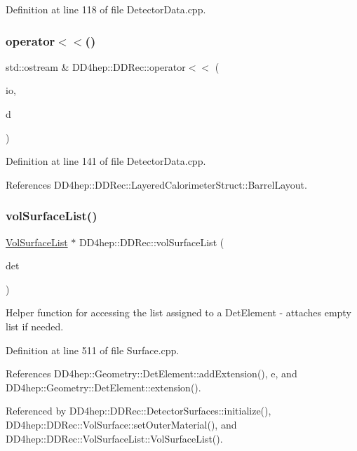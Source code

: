 Definition at line 118 of file Detector\+Data.\+cpp.

\hypertarget{namespace_d_d4hep_1_1_d_d_rec_a56c7e8b362aec38f71cfccb7b1bfd0a4}{}\label{namespace_d_d4hep_1_1_d_d_rec_a56c7e8b362aec38f71cfccb7b1bfd0a4} 
\subsubsection{\texorpdfstring{operator$<$$<$()}{operator<<()}\hspace{0.1cm}{\footnotesize\ttfamily [7/7]}}
{\footnotesize\ttfamily std\+::ostream \& D\+D4hep\+::\+D\+D\+Rec\+::operator$<$$<$ (\begin{DoxyParamCaption}\item[{std\+::ostream \&}]{io,  }\item[{const \hyperlink{namespace_d_d4hep_1_1_d_d_rec_ab7bf707189c3166efa20740e6f7524b9}{Layered\+Calorimeter\+Data} \&}]{d }\end{DoxyParamCaption})}



Definition at line 141 of file Detector\+Data.\+cpp.



References D\+D4hep\+::\+D\+D\+Rec\+::\+Layered\+Calorimeter\+Struct\+::\+Barrel\+Layout.

\hypertarget{namespace_d_d4hep_1_1_d_d_rec_a59c95bbf8cdb6547cfa3f9fa969d4031}{}\label{namespace_d_d4hep_1_1_d_d_rec_a59c95bbf8cdb6547cfa3f9fa969d4031} 
\subsubsection{\texorpdfstring{vol\+Surface\+List()}{volSurfaceList()}}
{\footnotesize\ttfamily \hyperlink{struct_d_d4hep_1_1_d_d_rec_1_1_vol_surface_list}{Vol\+Surface\+List} $\ast$ D\+D4hep\+::\+D\+D\+Rec\+::vol\+Surface\+List (\begin{DoxyParamCaption}\item[{\hyperlink{class_d_d4hep_1_1_geometry_1_1_det_element}{Geometry\+::\+Det\+Element} \&}]{det }\end{DoxyParamCaption})}

Helper function for accessing the list assigned to a Det\+Element -\/ attaches empty list if needed. 

Definition at line 511 of file Surface.\+cpp.



References D\+D4hep\+::\+Geometry\+::\+Det\+Element\+::add\+Extension(), e, and D\+D4hep\+::\+Geometry\+::\+Det\+Element\+::extension().



Referenced by D\+D4hep\+::\+D\+D\+Rec\+::\+Detector\+Surfaces\+::initialize(), D\+D4hep\+::\+D\+D\+Rec\+::\+Vol\+Surface\+::set\+Outer\+Material(), and D\+D4hep\+::\+D\+D\+Rec\+::\+Vol\+Surface\+List\+::\+Vol\+Surface\+List().

